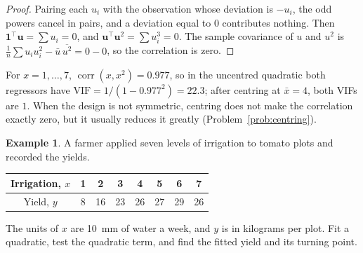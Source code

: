\documentclass[11pt,a4paper]{article}
\numberwithin{equation}{section}
\theoremstyle{definition}
\newtheorem{exa}[thm]{Example}
\begin{document}
\begin{proof}
Pairing each $u_i$ with the observation whose deviation is $-u_i$, the odd powers cancel in pairs, and a
deviation equal to $0$ contributes nothing. Then $\mathbf{1}^\top\mathbf{u} = \sum u_i = 0$, and $\mathbf{u}^\top\mathbf{u}^2 = \sum u_i^3 = 0$. The sample
covariance of $u$ and $u^2$ is $\frac{1}{n}\sum u_i u_i^2 - \bar u\,\overline{u^2} = 0 - 0$, so the correlation is zero.
\end{proof}

For $x = 1, \dots, 7$, $\operatorname{corr}(x, x^2) = 0.977$, so in the uncentred quadratic both regressors have
$\mathrm{VIF} = 1/(1 - 0.977^2) = 22.3$; after centring at $\bar x = 4$, both VIFs are $1$. When the design is not symmetric,
centring does not make the correlation exactly zero, but it usually reduces it greatly
(Problem~\ref{prob:centring}).

\begin{exa}\label{exa:irrigation}
A farmer applied seven levels of irrigation to tomato plots and recorded the yields.
\begin{center}
\begin{tabular}{c|ccccccc}
Irrigation, $x$ & 1 & 2 & 3 & 4 & 5 & 6 & 7 \\
\hline
Yield, $y$ & 8 & 16 & 23 & 26 & 27 & 29 & 26 \\
\end{tabular}
\end{center}
The units of $x$ are 10~mm of water a week, and $y$ is in kilograms per plot. Fit a quadratic, test the
quadratic term, and find the fitted yield and its turning point.
\end{exa}
\end{document}
